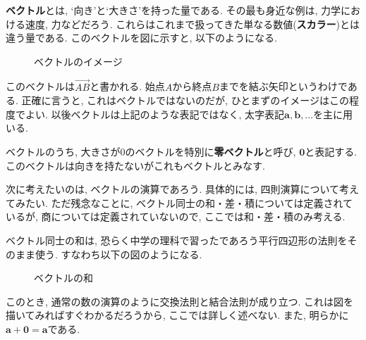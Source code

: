 \documentclass[a4j,dvipdfmx]{jsarticle}
\numberwithin{equation}{section}
\begin{document}
            \textbf{ベクトル}とは, `向き'と`大きさ'を持った量である. その最も身近な例は, 力学における速度, 力などだろう.
            これらはこれまで扱ってきた単なる数値(\textbf{スカラー})とは違う量である. このベクトルを図に示すと, 以下のようになる.
            \begin{figure}[h]
                \centering
                \caption{ベクトルのイメージ}
            \end{figure}

            このベクトルは$\overrightarrow{AB}$と書かれる. 始点$A$から終点$B$までを結ぶ矢印というわけである. 正確に言うと, これはベクトルではないのだが, ひとまずのイメージはこの程度でよい. 
            以後ベクトルは上記のような表記ではなく, 太字表記$\bm{a},\bm{b},\dots$を主に用いる.

            ベクトルのうち, 大きさが0のベクトルを特別に\textbf{零ベクトル}と呼び, $\bm{0}$と表記する. このベクトルは向きを持たないがこれもベクトルとみなす.

            次に考えたいのは, ベクトルの演算であろう. 具体的には, 四則演算について考えてみたい. ただ残念なことに, ベクトル同士の和・差・積については定義されているが, 商については定義されていないので, 
            ここでは和・差・積のみ考える.

            ベクトル同士の和は, 恐らく中学の理科で習ったであろう平行四辺形の法則をそのまま使う. すなわち以下の図のようになる.
            \begin{figure}[h]
                \centering
                \caption{ベクトルの和}
            \end{figure}
            このとき, 通常の数の演算のように交換法則と結合法則が成り立つ. これは図を描いてみればすぐわかるだろうから, ここでは詳しく述べない. また, 明らかに$\bm{a}+\bm{0}=\bm{a}$である.
\end{document}
